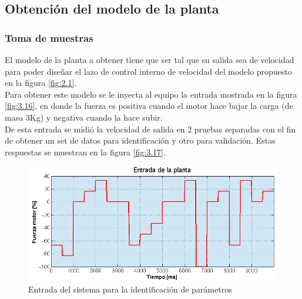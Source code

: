 
\subsection{Obtención del modelo de la planta}
\subsubsection{Toma de muestras}
El modelo de la planta a obtener tiene que ser tal que su salida sea de velocidad para poder diseñar el lazo de control interno de velocidad del modelo propuesto en la figura \ref{fig:2.1}.\\
Para obtener este modelo se le inyecta al equipo la entrada mostrada en la figura \ref{fig:3.16}, en donde la fuerza es positiva cuando el motor hace bajar la carga (de masa 3Kg) y negativa cuando la hace subir.\\
De esta entrada se midió la velocidad de salida en 2 pruebas separadas con el fin de obtener un set de datos para identificación y otro para validación. Estas respuestas se muestran en la figura \ref{fig:3.17}.

\begin{figure}[!ht]
	\centering
	\includegraphics[width=16cm,scale=1]{resources/3_16-entradaIdentPlanta.png}
	\caption{Entrada del sistema para la identificación de parámetros}
	\label{fig:\thefigure}
\end{figure}


